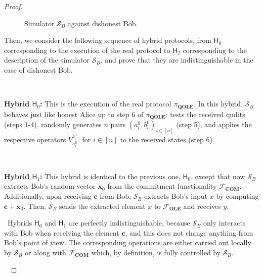 \begin{proof}
\begin{figure}[h!]
\begin{tcolorbox}
        \end{tcolorbox}
\caption{Simulator $\mathcal{S}_B$ against dishonest Bob.}
\label{fig:simulator_dis_Bob}
\end{figure}
Then, we consider the following sequence of hybrid protocols, from $\mathsf{H}_0$ corresponding to the execution of the real protocol to $\mathsf{H}_2$ corresponding to the description of the simulator $\mathcal{S}_B$, and prove that they are indistinguishable in the case of dishonest Bob.

\

\textbf{Hybrid $\mathsf{H}_0$:} This is the execution of the real protocol $\mathcal{\pi}_{\textbf{QOLE}}$. In this hybrid, $\mathcal{S}_B$ behaves just like honest Alice up to step 6 of $\mathcal{\pi}_{\textbf{QOLE}}$:  tests the received qudits  (steps 1-4), randomly generates $n$ pairs $(a^0_i, b^0_i)_{ i\in [n]}$ (step 5), and applies the respective operators $V^{b^0_i}_{a^0_i}$ ${ \text{ for } i\in [n]}$ to the received states (step 6).

\

\textbf{Hybrid $\mathsf{H}_1$:} This hybrid is identical to the previous one, $\mathsf{H}_0$, except that now $\mathcal{S}_B$ extracts Bob's random vector $\bm{x}_0$ from the commitment functionality $\mathcal{F}_{\textbf{COM}}$. Additionally, upon receiving $\bm{c}$ from Bob, $\mathcal{S}_B$ extracts Bob's input $x$ by computing $\bm{c} + \bm{x}_0$. Then,  $\mathcal{S}_B$ sends the extracted element $x$ to  $\mathcal{F}_{\textbf{OLE}}$ and receives $y$.

\ 
 Hybrids $\mathsf{H}_0$ and $\mathsf{H}_1$ are perfectly indistinguishable, because $\mathcal{S}_B$ only interacts with Bob when receiving the element $\bm{c}$, and this does not change anything from Bob's point of view. The corresponding operations are either carried out locally by $\mathcal{S}_B$ or along with  $\mathcal{F}_{\textbf{COM}}$ which, by definition, is fully controlled by $\mathcal{S}_B$.

\


\end{proof}
